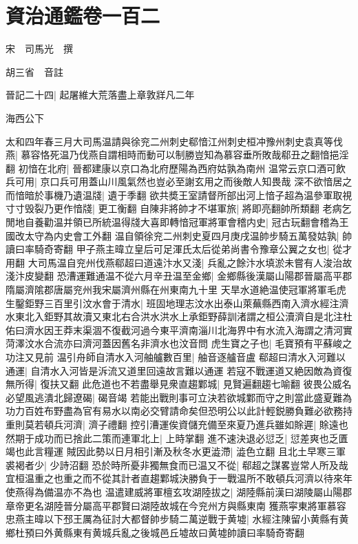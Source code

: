 \section{資治通鑑卷一百二}
宋　司馬光　撰

胡三省　音註

晉記二十四|{
	起屠維大荒落盡上章敦牂凡二年}


海西公下

太和四年春三月大司馬温請與徐兖二州刺史郗愔江州刺史桓冲豫州刺史袁真等伐燕|{
	慕容恪死温乃伐燕自謂相時而動可以制勝豈知為慕容垂所敗哉郗丑之翻愔挹淫翻}
初愔在北府|{
	晉都建康以京口為北府歷陽為西府姑孰為南州}
温常云京口酒可飲兵可用|{
	京口兵可用蓋山川風氣然也豈必至謝玄用之而後敵人知畏哉}
深不欲愔居之而愔暗於事機乃遺温牋|{
	遺于季翻}
欲共奬王室請督所部出河上愔子超為温參軍取視寸寸毁裂乃更作愔牋|{
	更工衡翻}
自陳非將帥才不堪軍旅|{
	將即亮翻帥所類翻}
老病乞閒地自養勸温并領已所統温得牋大喜即轉愔冠軍將軍會稽内史|{
	冠古玩翻會稽為王國改太守為内史會工外翻}
温自領徐兖二州刺史夏四月庚戌温帥步騎五萬發姑孰|{
	帥讀曰率騎奇寄翻}
甲子燕主暐立皇后可足渾氏太后從弟尚書令豫章公翼之女也|{
	從才用翻}
大司馬温自兖州伐燕郗超曰道遠汴水又淺|{
	兵亂之餘汴水填淤未嘗有人浚治故淺汴皮變翻}
恐漕運難通温不從六月辛丑温至金鄉|{
	金鄉縣後漢屬山陽郡晉屬高平郡隋屬濟隂郡唐屬兖州我宋屬濟州縣在州東南九十里}
天旱水道絶温使冠軍將軍毛虎生鑿鉅野三百里引汶水會于清水|{
	班固地理志汶水出泰山萊蕪縣西南入濟水經注濟水東北入鉅野其故瀆又東北右合洪水洪水上承鉅野薛訓渚謂之桓公瀆濟自是北注杜佑曰濟水因王莽末渠涸不復截河過今東平濟南淄川北海界中有水流入海謂之清河實菏澤汶水合流亦曰濟河蓋因舊名非濟水也汶音問}
虎生寶之子也|{
	毛寶預有平蘇峻之功注又見前}
温引舟師自清水入河舳艫數百里|{
	舳音逐艫音盧}
郗超曰清水入河難以通運|{
	自清水入河皆是泝流又道里回遠故言難以通運}
若寇不戰運道又絶因敵為資復無所得|{
	復扶又翻}
此危道也不若盡舉見衆直趨鄴城|{
	見賢遍翻趨七喻翻}
彼畏公威名必望風逃潰北歸遼碣|{
	碣音竭}
若能出戰則事可立決若欲城鄴而守之則當此盛夏難為功力百姓布野盡為官有易水以南必交臂請命矣但恐明公以此計輕鋭勝負難必欲務持重則莫若頓兵河濟|{
	濟子禮翻}
控引漕運俟資儲充備至來夏乃進兵雖如賖遲|{
	賖遠也}
然期于成功而已捨此二策而連軍北上|{
	上時掌翻}
進不速決退必愆乏|{
	愆差爽也乏匱竭也此言糧運}
賊因此勢以日月相引漸及秋冬水更澁滯|{
	澁色立翻}
且北土早寒三軍裘褐者少|{
	少詩沼翻}
恐於時所憂非獨無食而已温又不從|{
	郗超之謀畧豈常人所及哉宜桓温重之也重之而不從其計者直趨鄴城決勝負于一戰温所不敢頓兵河濟以待來年使燕得為備温亦不為也}
温遣建威將軍檀玄攻湖陸拔之|{
	湖陸縣前漢曰湖陵屬山陽郡章帝更名湖陸晉分屬高平郡賢曰湖陸故城在今兖州方與縣東南}
獲燕寜東將軍慕容忠燕主暐以下邳王厲為征討大都督帥步騎二萬逆戰于黄墟|{
	水經注陳留小黄縣有黄鄉杜預曰外黄縣東有黄城兵亂之後城邑丘墟故曰黄墟帥讀曰率騎奇寄翻}
